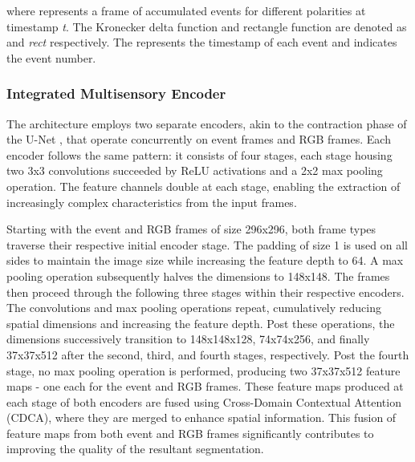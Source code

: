 \documentclass[lettersize,journal]{IEEEtran}
\begin{document}
where   represents a frame of accumulated events for different polarities  at timestamp \textit{t}. The Kronecker delta function and rectangle function are denoted as  and \textit{rect} respectively. The  represents the timestamp of each event and  indicates the event number.





\subsubsection{\textbf{Integrated Multisensory Encoder}}
\label{subsubsection : Integrated Multi-sensory Encoder}

The architecture employs two separate encoders, akin to the contraction phase of the U-Net \cite{Lv2020AttentionSegmentation}, that operate concurrently on event frames and RGB frames. Each encoder follows the same pattern: it consists of four stages, each stage housing two 3x3 convolutions succeeded by ReLU activations and a 2x2 max pooling operation. The feature channels double at each stage, enabling the extraction of increasingly complex characteristics from the input frames.

Starting with the event and RGB frames of size 296x296, both frame types traverse their respective initial encoder stage. The padding of size 1 is used on all sides to maintain the image size while increasing the feature depth to 64. A max pooling operation subsequently halves the dimensions to 148x148. The frames then proceed through the following three stages within their respective encoders. The convolutions and max pooling operations repeat, cumulatively reducing spatial dimensions and increasing the feature depth. Post these operations, the dimensions successively transition to 148x148x128, 74x74x256, and finally 37x37x512 after the second, third, and fourth stages, respectively. Post the fourth stage, no max pooling operation is performed, producing two 37x37x512 feature maps - one each for the event and RGB frames. These feature maps produced at each stage of both encoders are fused using Cross-Domain Contextual Attention (CDCA), where they are merged to enhance spatial information. This fusion of feature maps from both event and RGB frames significantly contributes to improving the quality of the resultant segmentation.
\end{document}
